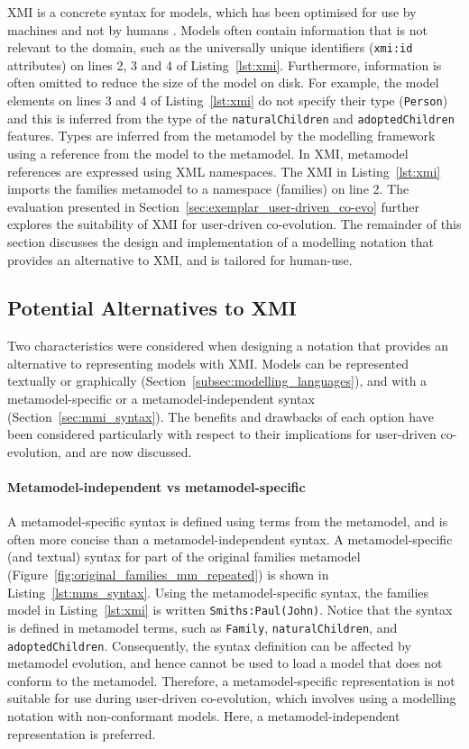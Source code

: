 XMI is a concrete syntax for models, which has been optimised for use by machines and not by humans \cite{hutn}. Models often contain information that is not relevant to the domain, such as the universally unique identifiers (\texttt{xmi:id} attributes) on lines 2, 3 and 4 of Listing~\ref{lst:xmi}. Furthermore, information is often omitted to reduce the size of the model on disk. For example, the model elements on lines 3 and 4 of Listing~\ref{lst:xmi} do not specify their type (\texttt{Pe\-rs\-on}) and this is inferred from the type of the \texttt{na\-tu\-ralCh\-il\-dr\-en} and \texttt{ad\-op\-t\-edCh\-il\-dr\-en} features. Types are inferred from the metamodel by the modelling framework using a reference from the model to the metamodel. In XMI, metamodel references are expressed using XML namespaces. The XMI in Listing~\ref{lst:xmi} imports the families metamodel to a namespace (families) on line 2. The evaluation presented in Section~\ref{sec:exemplar_user-driven_co-evo} further explores the suitability of XMI for user-driven co-evolution. The remainder of this section discusses the design and implementation of a modelling notation that provides an alternative to XMI, and is tailored for human-use.

\subsection{Potential Alternatives to XMI}
\label{subsec:alternatives_to_xmi}
Two characteristics were considered when designing a notation that provides an alternative to representing models with XMI. Models can be represented textually or graphically (Section~\ref{subsec:modelling_languages}), and with a metamodel-specific or a metamodel-independent syntax (Section~\ref{sec:mmi_syntax}). The benefits and drawbacks of each option have been considered particularly with respect to their implications for user-driven co-evolution, and are now discussed.

\paragraph{Metamodel-independent vs metamodel-specific} A metamodel-specific syntax is defined using terms from the metamodel, and is often more concise than a metamodel-independent syntax. A metamodel-specific (and textual) syntax for part of the original families metamodel (Figure~\ref{fig:original_families_mm_repeated}) is shown in Listing~\ref{lst:mms_syntax}. Using the metamodel-specific syntax, the families model in Listing~\ref{lst:xmi} is written \texttt{Smiths:Paul(John)}. Notice that the syntax is defined in metamodel terms, such as \texttt{Fa\-mi\-ly}, \texttt{na\-tu\-ralCh\-il\-dr\-en}, and \texttt{ad\-op\-tedCh\-il\-dr\-en}. Consequently, the syntax definition can be affected by metamodel evolution, and hence cannot be used to load a model that does not conform to the metamodel. Therefore, a metamodel-specific representation is not suitable for use during user-driven co-evolution, which involves using a modelling notation with non-conformant models. Here, a metamodel-independent representation is preferred.

